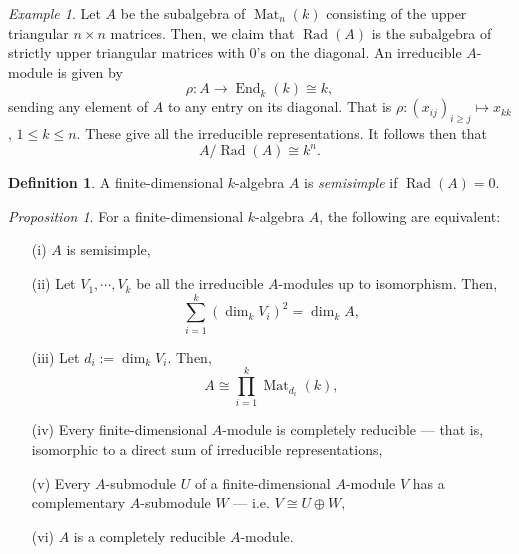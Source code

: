\documentclass[a4paper]{report}
\theoremstyle{definition}
\newtheorem{definition}{Definition}
\theoremstyle{remark}
\theoremstyle{proposition}
\newtheorem{proposition}{Proposition}
\theoremstyle{conjecture}
\theoremstyle{lemma}
\theoremstyle{corollary}
\theoremstyle{exercise}
\theoremstyle{example}
\newtheorem{example}{Example}
\newcommand{\on}{\operatorname}
\begin{document}
\begin{example}
    Let $A$ be the subalgebra of $\on{Mat}_n(k)$ consisting of the upper 
    triangular $n\times n$ matrices. 
    Then, we claim that $\on{Rad}(A)$ is the subalgebra of strictly upper 
    triangular matrices with $0$'s on the diagonal.
    An irreducible $A$-module is given by 
    $$\rho : A \longrightarrow \on{End}_k(k) \cong k,$$
    sending any element of $A$ to any entry on its diagonal.
    That is $\rho : (x_{ij})_{i\geq j} \mapsto x_{kk}$, $1\leq k \leq n$.
    These give all the irreducible representations.
    It follows then that 
    $$A/\on{Rad}(A) \cong k^n.$$
\end{example}

\begin{definition}
    A finite-dimensional $k$-algebra $A$ is \emph{semisimple} if
    $\on{Rad}(A) = 0$.
\end{definition}

\begin{proposition}
    For a finite-dimensional $k$-algebra $A$, the following are equivalent:
    \begin{itemize}
        \item[(i)] $A$ is semisimple,
        \item[(ii)] Let $V_1,\cdots,V_k$ be all the irreducible 
            $A$-modules up to isomorphism. Then,
            $$\sum_{i=1}^k (\dim_kV_i)^2 = \dim_kA,$$
        \item[(iii)] Let $d_i := \dim_kV_i$. Then,
            $$A \cong \prod_{i=1}^k\on{Mat}_{d_i}(k),$$
        \item[(iv)] Every finite-dimensional $A$-module is completely
            reducible --- that is, isomorphic to a direct sum of 
            irreducible representations,
        \item[(v)] Every $A$-submodule $U$ of a finite-dimensional
            $A$-module $V$ has a complementary $A$-submodule $W$ --- i.e.
            $V\cong U \oplus W$,
        \item[(vi)] $A$ is a completely reducible $A$-module.
    \end{itemize}
\end{proposition}
\end{document}
